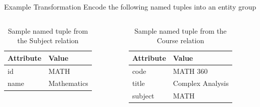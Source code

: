 \documentclass[compress]{beamer}
\begin{document}
		\begin{frame}{Example Transformation}
			Encode the following named tuples into an entity group
			
			\begin{columns}[T]
				\begin{column}{.5\textwidth}
					\begin{table}
						\centering
						
						\begin{tabular}{ll}
							\toprule
							Attribute & Value \\
							\midrule
							id & MATH \\
							name & Mathematics \\
							\bottomrule
						\end{tabular}
						
						\caption{Sample named tuple from the \alert{Subject} relation}
					\end{table}
				\end{column}
				\hfill
				\begin{column}{.5\textwidth}
					\begin{table}
						\centering
						
						\begin{tabular}{ll}
							\toprule
							Attribute & Value \\
							\midrule
							code & MATH 360 \\
							title & Complex Analysis \\
							subject & MATH \\
							\bottomrule
						\end{tabular}
						
						\caption{Sample named tuple from the \alert{Course} relation}
					\end{table}
				\end{column}
			\end{columns}
		\end{frame}
		
\end{document}
